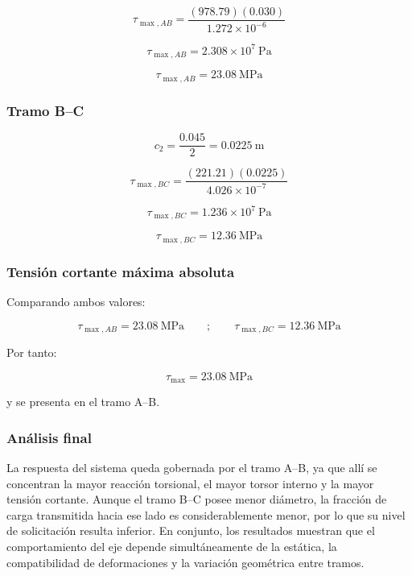 \documentclass[12pt,a4paper]{article}
\begin{document}
\begin{enumerate}
\begin{equation}
\tau_{\max,AB}=\frac{(978.79)(0.030)}{1.272\times10^{-6}}
\end{equation}

\begin{equation}
\tau_{\max,AB}=2.308\times10^7\ \text{Pa}
\end{equation}

\begin{equation}
\boxed{\tau_{\max,AB}=23.08\ \text{MPa}}
\end{equation}

\subsubsection*{Tramo B--C}

\begin{equation}
c_2=\frac{0.045}{2}=0.0225\ \text{m}
\end{equation}

\begin{equation}
\tau_{\max,BC}=\frac{(221.21)(0.0225)}{4.026\times10^{-7}}
\end{equation}

\begin{equation}
\tau_{\max,BC}=1.236\times10^7\ \text{Pa}
\end{equation}

\begin{equation}
\boxed{\tau_{\max,BC}=12.36\ \text{MPa}}
\end{equation}

\subsubsection*{Tensión cortante máxima absoluta}

Comparando ambos valores:

\begin{equation}
\tau_{\max,AB}=23.08\ \text{MPa}
\qquad ; \qquad
\tau_{\max,BC}=12.36\ \text{MPa}
\end{equation}

Por tanto:

\begin{equation}
\boxed{\tau_{\max}=23.08\ \text{MPa}}
\end{equation}

y se presenta en el tramo A--B.


\subsubsection*{Análisis final}

La respuesta del sistema queda gobernada por el tramo A--B, ya que allí se concentran la mayor reacción torsional, el mayor torsor interno y la mayor tensión cortante. Aunque el tramo B--C posee menor diámetro, la fracción de carga transmitida hacia ese lado es considerablemente menor, por lo que su nivel de solicitación resulta inferior. En conjunto, los resultados muestran que el comportamiento del eje depende simultáneamente de la estática, la compatibilidad de deformaciones y la variación geométrica entre tramos.
\end{enumerate}
\end{document}

